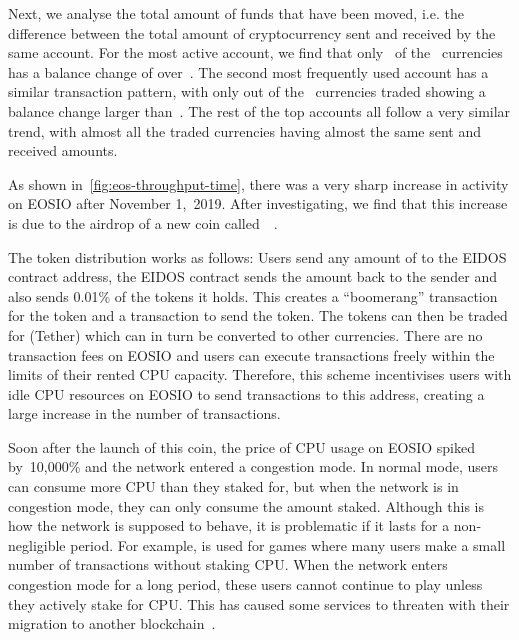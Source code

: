 Next, we analyse the total amount of funds that have been moved, i.e. the difference between the total amount of cryptocurrency sent and received by the same account.
For the most active account, we find that only~ of the~ currencies has a balance change of over~.
The second most frequently used account has a similar transaction pattern, with only  out of the~ currencies traded showing a balance change larger than~.
The rest of the top accounts all follow a very similar trend, with almost all the traded currencies having almost the same sent and received amounts.


As shown in~\autoref{fig:eos-throughput-time}, there was a very sharp increase in activity on EOSIO after November 1,~2019. After investigating, we find that this increase is due to the airdrop of a new coin called~~\cite{Enumivo2019}.

The token distribution works as follows: Users send any amount of  to the EIDOS contract address, the EIDOS contract sends the  amount back to the sender and also sends 0.01\% of the  tokens it holds. This creates a ``boomerang'' transaction for the  token and a transaction to send the  token. The tokens can then be traded for  (Tether) which can in turn be converted to other currencies. There are no transaction fees on EOSIO and users can execute transactions freely within the limits of their rented CPU capacity. Therefore, this scheme incentivises users with idle CPU resources on EOSIO to send transactions to this address, creating a large increase in the number of transactions.

Soon after the launch of this coin, the price of CPU usage on EOSIO spiked by~10,000\% and the network entered a congestion mode.
In normal mode, users can consume more CPU than they staked for, but when the network is in congestion mode, they can only consume the amount staked. Although this is how the network is supposed to behave, it is problematic if it lasts for a non-negligible period. For example,  is used for games where many users make a small number of transactions without staking CPU. When the network enters congestion mode for a long period, these users cannot continue to play unless they actively stake  for CPU.
This has caused some services to threaten with their migration to another blockchain~\cite{EarnBet2019EOSNotice}.

